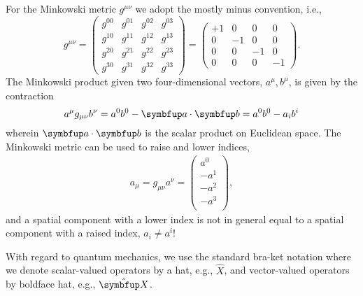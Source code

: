 For the Minkowski metric $g^{\mu\nu}$ we adopt the mostly minus convention, i.e.,
\begin{equation*}
	g^{\mu\nu}
	=
	\begin{pmatrix}
		g^{00} & g^{01} & g^{02} & g^{03} \\
		g^{10} & g^{11} & g^{12} & g^{13} \\
		g^{20} & g^{21} & g^{22} & g^{23} \\
		g^{30} & g^{31} & g^{32} & g^{33}
	\end{pmatrix}
	=
	\begin{pmatrix}
		+1 & 0 & 0 & 0 \\
		0 & -1 & 0 & 0 \\
		0 & 0 & -1 & 0 \\
		0 & 0 & 0 & -1
	\end{pmatrix}
	.
\end{equation*}
The Minkowski product given two four-dimensional vectors, $a^\mu,b^\mu$, is given by the contraction
\begin{equation*}
	a^\mu g_{\mu\nu} b^\nu
	=
	a^0 b^0
	-
	\vb{a}\vdot\vb{b}
	=
	a^0 b^0
	-
	a_i b^i
\end{equation*}
wherein $\vb{a}\vdot\vb{b}$ is the scalar product on Euclidean space.
The Minkowski metric can be used to raise and lower indices,
\begin{align*}
	a_\mu
	=
	g_{\mu\nu}
	a^\nu
	=
	\begin{pmatrix}
		a^0 \\
		-a^1 \\
		-a^2 \\
		-a^3 \\
	\end{pmatrix}
	,
\end{align*}
and a spatial component with a lower index is not in general equal to a spatial component with a raised index, $a_i\neq a^i$!

With regard to quantum mechanics, we use the standard bra-ket notation where we denote scalar-valued operators by a hat, e.g., $\hat{X}$, and vector-valued operators by boldface hat, e.g., $\vu{X}$.